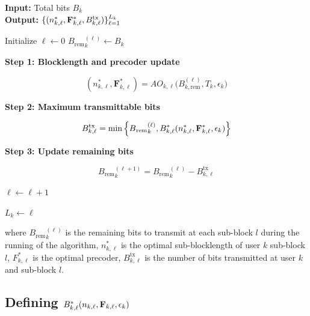 \documentclass[a4paper, 12pt, onecolumn, journal, twoside, draftclsnofoot]{IEEEtran}
\begin{document}
\begin{algorithm}[H]
\caption{Greedy Allocation of Bits for User $k$}
\textbf{Input:} Total bits $B_k$ \\
\textbf{Output:} $\{(n^*_{k,\ell},{\bf F}^*_{k,\ell},B^{\text{tx}}_{k,\ell})\}_{\ell=1}^{L_k}$
\begin{algorithmic}[1]

\State Initialize $\ell \gets 0$
\State $B{_\text{rem}}^{(\ell)}_k \gets B_k$


\State \textbf{Step 1: Blocklength and precoder update}

\begin{equation*}
(n^*_{k,\ell},\mathbf{F}^*_{k,\ell})
=
AO_{k,\ell}\big(B^{(\ell)}_{k,\text{rem}}, T_k, \epsilon_k \big)
\end{equation*}


\State \textbf{Step 2: Maximum transmittable bits}

\begin{equation*}
B^{\text{tx}}_{k,\ell}
=
\min
\Big\{
B{_\text{rem}}^{(\ell)}_k,
B^*_{k,\ell}(n^*_{k,\ell},{\bf F}^*_{k,\ell}, \epsilon_k)
\Big\}
\end{equation*}

\State \textbf{Step 3: Update remaining bits}

\begin{equation*}
B{_\text{rem}}^{(\ell+1)}_k = B{_\text{rem}}^{(\ell)}_k - B^{\text{tx}}_{k,\ell}
\end{equation*}

\State $\ell \gets \ell + 1$

\EndWhile

\State $L_k \gets \ell$

\end{algorithmic}
\end{algorithm}

where $B{_\text{rem}}^{(\ell)}_k$ is the remaining bits to transmit at each sub-block $l$ during the running of the algorithm,  $n^*_{k, \ell}$ is the optimal sub-blocklength of user $k$ sub-block $l$, $F^*_{k, \ell}$ is the optimal precoder, $B^{\text{tx}}_{k, \ell}$ is the number of bits transmitted at user $k$ and sub-block $l$.


\subsection{Defining $B^*_{k,\ell}(n_{k,\ell}, {\bf F}_{k, \ell}, \epsilon_k)$}
\end{document}
